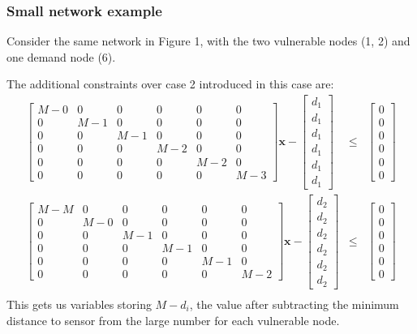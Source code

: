 \documentclass[authoryear,preprint,review,12pt]{elsarticle}
\begin{document}
\subsubsection*{Small network example}

Consider the same network in Figure 1, with the two vulnerable nodes
(1, 2) and one demand node (6).

The additional constraints over case 2 introduced in this case are:
\begin{eqnarray*}
\left[\begin{array}{cccccc}
M-0 & 0 & 0 & 0 & 0 & 0\\
0 & M-1 & 0 & 0 & 0 & 0\\
0 & 0 & M-1 & 0 & 0 & 0\\
0 & 0 & 0 & M-2 & 0 & 0\\
0 & 0 & 0 & 0 & M-2 & 0\\
0 & 0 & 0 & 0 & 0 & M-3
\end{array}\right]\mathbf{x}-\left[\begin{array}{c}
d_{1}\\
d_{1}\\
d_{1}\\
d_{1}\\
d_{1}\\
d_{1}
\end{array}\right] & \leq & \left[\begin{array}{c}
0\\
0\\
0\\
0\\
0\\
0
\end{array}\right]\\
\left[\begin{array}{cccccc}
M-M & 0 & 0 & 0 & 0 & 0\\
0 & M-0 & 0 & 0 & 0 & 0\\
0 & 0 & M-1 & 0 & 0 & 0\\
0 & 0 & 0 & M-1 & 0 & 0\\
0 & 0 & 0 & 0 & M-1 & 0\\
0 & 0 & 0 & 0 & 0 & M-2
\end{array}\right]\mathbf{x}-\left[\begin{array}{c}
d_{2}\\
d_{2}\\
d_{2}\\
d_{2}\\
d_{2}\\
d_{2}
\end{array}\right] & \leq & \left[\begin{array}{c}
0\\
0\\
0\\
0\\
0\\
0
\end{array}\right]\\
\end{eqnarray*}
This gets us variables storing $M-d_{i}$, the value after subtracting
the minimum distance to sensor from the large number for each vulnerable
node.
\end{document}

